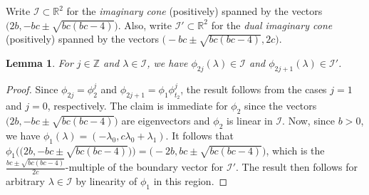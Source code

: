 \documentclass{amsart}
\newtheorem{lemma}[theorem]{Lemma}
\numberwithin{theorem}{section}
\newcommand{\cI}{\mathcal{I}}
\newcommand{\RR}{\mathbb{R}}
\newcommand{\ZZ}{\mathbb{Z}}
\begin{document}
  Write $\cI \subset \RR^2$ for the \emph{imaginary cone} (positively) spanned by the vectors $\big(2b,-bc\pm\sqrt{bc(bc-4)}\big)$.
  Also, write $\cI' \subset \RR^2$ for the \emph{dual imaginary cone} (positively) spanned by the vectors $\big(-bc\pm\sqrt{bc(bc-4)},2c\big)$.
  \begin{lemma}
    \label{le:imaginary stability}
    For $j\in\ZZ$ and $\lambda\in\cI$, we have $\phi_{2j}(\lambda)\in\cI$ and $\phi_{2j+1}(\lambda)\in\cI'$.
  \end{lemma}
  \begin{proof}
    Since $\phi_{2j}=\phi_2^j$ and $\phi_{2j+1}=\phi_1\phi_{t_2}^j$, the result follows from the cases $j=1$ and $j=0$, respectively.
    The claim is immediate for $\phi_2$ since the vectors $\big(2b,-bc\pm\sqrt{bc(bc-4)}\big)$ are eigenvectors and $\phi_2$ is linear in $\cI$.
    Now, since $b>0$, we have $\phi_1(\lambda)=(-\lambda_0,c\lambda_0+\lambda_1)$.
    It follows that $\phi_1\Big( \big(2b,-bc\pm\sqrt{bc(bc-4)}\big) \Big)=\big(-2b,bc\pm\sqrt{bc(bc-4)}\big)$, which is the $\frac{bc\pm\sqrt{bc(bc-4)}}{2c}$-multiple of the boundary vector for $\cI'$.
    The result then follows for arbitrary $\lambda\in\cI$ by linearity of $\phi_1$ in this region.
  \end{proof}
\end{document}
